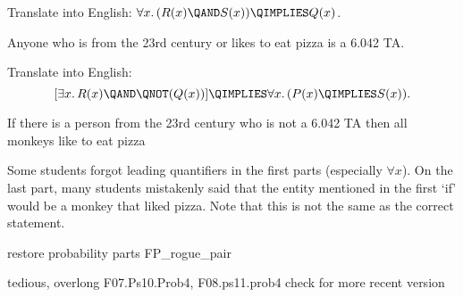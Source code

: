 \begin{problem}
\begin{problemparts}
\ppart Translate into English: $\forall x.\, (R(x) \QAND S(x)) \QIMPLIES
Q(x)$.

\begin{solution}
Anyone who is from the 23rd century or  likes to eat pizza is a 6.042 TA.
\end{solution}

\ppart Translate into English:
\[
[\exists x.\, R(x) \QAND \QNOT(Q(x))]
\QIMPLIES \forall x.\,(P(x) \QIMPLIES S(x)).
\]

\begin{solution}
If there is a person from the 23rd century who is not a 6.042 TA then all monkeys like to eat pizza
\end{solution}

\begin{solution}
Some students forgot leading quantifiers in the first parts (especially
$\forall x$). On the last part, many students mistakenly said that
the entity mentioned in the first `if' would be a monkey that liked
pizza. Note that this is not the same as the correct statement.
\end{solution}

\end{problemparts}
\end{problem}

\begin{problem}
restore probability parts FP_rogue_pair
\end{problem}

\begin{staffnotes}
tedious, overlong
F07.Ps10.Prob4, F08.ps11.prob4
check for more recent version
\end{staffnotes}

